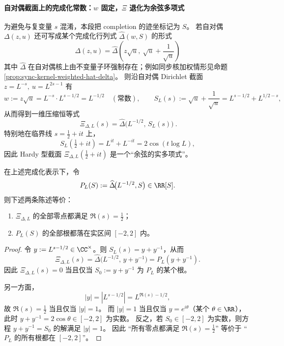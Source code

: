 \paragraph{自对偶截面上的完成化常数：\texorpdfstring{$w$}{w} 固定，\texorpdfstring{$\Xi$}{Xi} 退化为余弦多项式}
为避免与复变量 \(s\) 混淆，本段把 completion 的迹坐标记为 \(S\)。
若自对偶 \(\Delta(z,u)\) 还可写成某个完成化行列式
\(\widehat\Delta(w,S)\) 的形式
\[
\Delta(z,u)=\widehat\Delta\!\left(z\sqrt{u},\ \sqrt{u}+\frac{1}{\sqrt{u}}\right)
\]
其中 \(\widehat\Delta\) 在自对偶核上由不变量子环强制存在；例如同步核加权情形见命题 \ref{prop:sync-kernel-weighted-hat-delta}。
则沿自对偶 Dirichlet 截面 \(z=L^{-s},\ u=L^{2s-1}\) 有
\[
w:=z\sqrt{u}=L^{-s}\cdot L^{s-1/2}=L^{-1/2}\quad(\text{常数}),
\qquad
S_L(s):=\sqrt{u}+\frac{1}{\sqrt{u}}=L^{s-1/2}+L^{1/2-s},
\]
从而得到一维压缩恒等式
\[
\boxed{\ \Xi_{\Delta,L}(s)=\widehat\Delta\!\bigl(L^{-1/2},\,S_L(s)\bigr)\ }.
\]
特别地在临界线 \(s=\tfrac12+it\) 上，
\[
S_L\!\left(\tfrac12+it\right)=L^{it}+L^{-it}=2\cos(t\log L),
\]
因此 Hardy 型截面 \(\Xi_{\Delta,L}(\tfrac12+it)\) 是一个“余弦的实多项式”。





\begin{proposition}\label{prop:xi-rh-interval-criterion}
在上述完成化表示下，令
\[
P_L(S):=\widehat\Delta\!\bigl(L^{-1/2},S\bigr)\in\RR[S].
\]
则下述两条陈述等价：
\begin{enumerate}
  \item \(\Xi_{\Delta,L}\) 的全部零点都满足 \(\Re(s)=\tfrac12\)；
  \item \(P_L(S)\) 的全部根都落在实区间 \([-2,2]\) 内。
\end{enumerate}
\end{proposition}
\begin{proof}
令 \(y:=L^{s-1/2}\in\CC^\times\)。则 \(S_L(s)=y+y^{-1}\)，从而
\[
\Xi_{\Delta,L}(s)=\widehat\Delta\!\bigl(L^{-1/2},\,y+y^{-1}\bigr)=P_L(y+y^{-1}).
\]
因此 \(\Xi_{\Delta,L}(s)=0\) 当且仅当 \(S_0:=y+y^{-1}\) 为 \(P_L\) 的某个根。
\par
另一方面，
\[
|y|=|L^{s-1/2}|=L^{\Re(s)-1/2},
\]
故 \(\Re(s)=\tfrac12\) 当且仅当 \(|y|=1\)。
而 \(|y|=1\) 当且仅当 \(y=e^{i\theta}\)（某个 \(\theta\in\RR\)），此时
\(
y+y^{-1}=2\cos\theta\in[-2,2]
\) 为实数。
反之，若 \(S_0\in[-2,2]\) 为实数，则方程 \(y+y^{-1}=S_0\) 的解满足 \(|y|=1\)。
因此 “所有零点都满足 \(\Re(s)=\tfrac12\)” 等价于 “\(P_L\) 的所有根都在 \([-2,2]\)”。
\end{proof}

